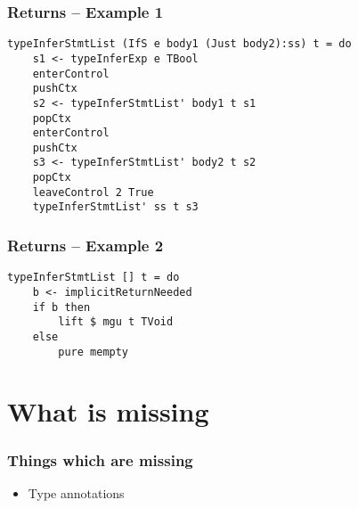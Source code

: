 \documentclass{beamer}
\begin{document}
\begin{frame}[fragile]
\frametitle{Returns -- Example 1}
\begin{lstlisting}
typeInferStmtList (IfS e body1 (Just body2):ss) t = do
    s1 <- typeInferExp e TBool
    enterControl
    pushCtx
    s2 <- typeInferStmtList' body1 t s1
    popCtx
    enterControl
    pushCtx
    s3 <- typeInferStmtList' body2 t s2
    popCtx
    leaveControl 2 True
    typeInferStmtList' ss t s3
\end{lstlisting}
\end{frame}

\begin{frame}[fragile]
\frametitle{Returns -- Example 2}
\begin{lstlisting}
typeInferStmtList [] t = do
    b <- implicitReturnNeeded
    if b then
        lift $ mgu t TVoid
    else
        pure mempty
\end{lstlisting}
\end{frame}
\section{What is missing}

\begin{frame}
\frametitle{Things which are missing}

\begin{itemize}
\item Type annotations
\end{itemize}
\end{frame}
\end{document}
